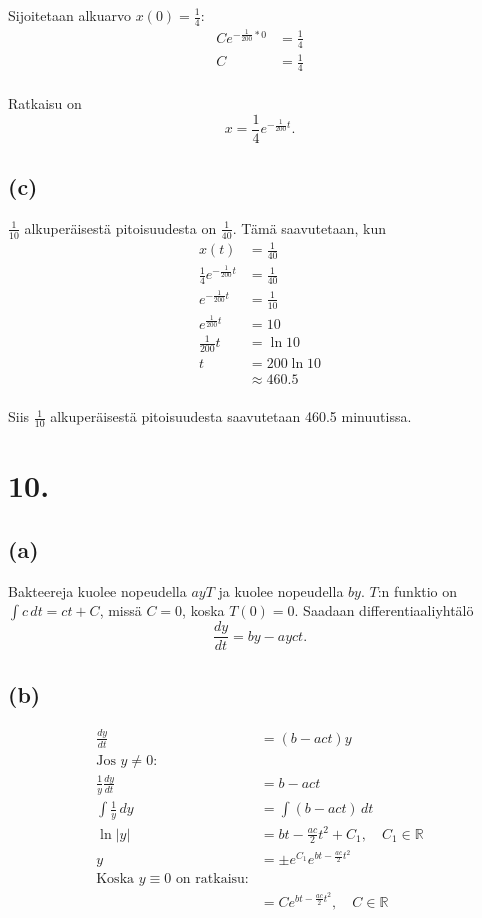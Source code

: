 \documentclass{article}
\begin{document}
Sijoitetaan alkuarvo $x(0) = \frac{1}{4}$:
\begin{align*}
  Ce^{-\frac{1}{200}*0} &= \frac{1}{4} \\
  C &= \frac{1}{4} \\
\end{align*}

Ratkaisu on
\[
  x = \frac{1}{4}e^{-\frac{1}{200}t}.
\]

\subsection*{(c)}

$\frac{1}{10}$ alkuperäisestä pitoisuudesta on $\frac{1}{40}$.
Tämä saavutetaan, kun
\begin{align*}
  x(t) &= \frac{1}{40} \\
  \frac{1}{4}e^{-\frac{1}{200}t} &= \frac{1}{40} \\
  e^{-\frac{1}{200}t} &= \frac{1}{10} \\
  e^{\frac{1}{200}t} &= 10 \\
  \frac{1}{200}t &= \ln 10 \\
  t &= 200 \ln 10 \\
    &\approx 460.5 \\
\end{align*}

Siis $\frac{1}{10}$ alkuperäisestä pitoisuudesta saavutetaan 460.5 minuutissa.

\section*{10.}

\subsection*{(a)}

Bakteereja kuolee nopeudella $ayT$ ja kuolee nopeudella $by$.
$T$:n funktio on $\int c\,dt = ct + C$, missä $C = 0$, koska $T(0) = 0$.
Saadaan differentiaaliyhtälö
\[
  \frac{dy}{dt} = by - ayct.
\]

\subsection*{(b)}

\begin{align*}
  \frac{dy}{dt} &= (b - act)y \\
  \text{Jos $y \neq 0$:} \\
  \frac{1}{y}\frac{dy}{dt} &= b - act \\
  \int \frac{1}{y}\,dy &= \int (b - act)\,dt \\
  \ln |y| &= bt - \frac{ac}{2}t^2 + C_1, \quad C_1 \in \mathbb{R} \\
  y &= \pm e^{C_1} e^{bt - \frac{ac}{2}t^2} \\
  \text{Koska $y \equiv 0$ on ratkaisu:} \\
    &= Ce^{bt - \frac{ac}{2}t^2}, \quad C \in \mathbb{R} \\
\end{align*}
\end{document}
